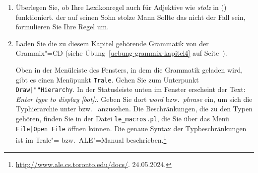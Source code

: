 {\begin{enumerate}
\item Überlegen Sie, ob Ihre Lexikonregel auch für Adjektive wie \emph{stolz} in ()
  funktioniert.
\ea
der auf seinen Sohn stolze Mann
\z
Sollte das nicht der Fall sein, formulieren Sie Ihre Regel um.

\item Laden Sie die zu diesem Kapitel gehörende Grammatik von der Grammix"=CD
(siehe Übung~\ref{uebung-grammix-kapitel4} auf Seite~\pageref{uebung-grammix-kapitel4}).

Oben in der Menüleiste des Fensters, in dem die Grammatik geladen wird, gibt es einen Menüpunkt \texttt{Trale}.
Gehen Sie zum  Unterpunkt \texttt{Draw|""Hierarchy}. 
In der Statusleiste unten im Fenster erscheint der Text: \emph{Enter type to display [bot]:}.
Geben Sie dort \emph{word} bzw.\ \emph{phrase} ein, um sich die Typhierarchie unter
 bzw.\  anzusehen. Die Beschränkungen, die zu den Typen gehören, finden
Sie in der Datei \texttt{le\_macros.pl}, die Sie über das Menü \texttt{File|Open File} öffnen können.
Die genaue Syntax der Typbeschränkungen ist im Trale"= bzw.\ ALE"=Manual beschrieben.\footnote{
\url{http://www.ale.cs.toronto.edu/docs/}. 24.05.2024.%
}
\end{enumerate}
}




